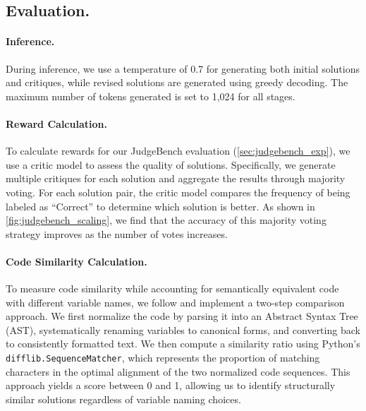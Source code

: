 \subsection{Evaluation.}\label{appendix:evaluation_details}

\paragraph{Inference.} 
During inference, we use a temperature of 0.7 for generating both initial solutions and critiques, while revised solutions are generated using greedy decoding. The maximum number of tokens generated is set to 1,024 for all stages. 

\paragraph{Reward Calculation.} 
To calculate rewards for our JudgeBench evaluation (\cref{sec:judgebench_exp}), we use a critic model to assess the quality of solutions. Specifically, we generate multiple critiques for each solution and aggregate the results through majority voting. For each solution pair, the critic model compares the frequency of being labeled as ``Correct'' to determine which solution is better. As shown in \cref{fig:judgebench_scaling}, we find that the accuracy of this majority voting strategy improves as the number of votes increases.

\paragraph{Code Similarity Calculation.}
To measure code similarity while accounting for semantically equivalent code with different variable names, we follow \citep{zheng2024makes} and implement a two-step comparison approach. We first normalize the code by parsing it into an Abstract Syntax Tree (AST), systematically renaming variables to canonical forms, and converting back to consistently formatted text. We then compute a similarity ratio using Python's \texttt{difflib.SequenceMatcher}, which represents the proportion of matching characters in the optimal alignment of the two normalized code sequences. This approach yields a score between 0 and 1, allowing us to identify structurally similar solutions regardless of variable naming choices.



